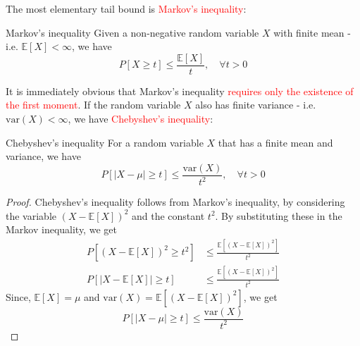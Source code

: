 \documentclass[10pt,handout,english]{beamer}
\newcommand{\E}{\mathbb{E}}
\begin{document}
\begin{frame}[allowframebreaks]
The most elementary tail bound is \textcolor{red}{Markov's inequality}:
\begin{block}{Markov's inequality}
Given a non-negative random variable $X$ with finite mean - i.e. $\E[X]<\infty$, we have
\[
P[X\geq t]\leq\frac{\E[X]}{t},\quad \forall t>0
\]
\end{block}
It is immediately obvious that Markov's inequality \textcolor{red}{requires only the existence of the first moment}. If the random variable $X$ also has finite variance - i.e. $\text{var}(X)<\infty$, we have \textcolor{red}{Chebyshev's inequality}:
\begin{block}{Chebyshev's inequality}
For a random variable $X$ that has a finite mean and variance, we have
\[
P[\lvert X-\mu \rvert\geq t]\leq\frac{\text{var}(X)}{t^2},\quad \forall t>0
\]
\end{block} 
\end{frame}
\begin{frame}
\begin{proof}
Chebyshev's inequality follows from Markov's inequality, by considering the variable $(X-\E[X])^2$ and the constant $t^2$. By substituting these in the Markov inequality, we get
\begin{align}
P[(X-\E[X])^2\geq t^2]&\leq \frac{\E[(X-\E[X])^2]}{t^2}\\
P[\lvert X-\E[X] \rvert\geq t]&\leq\frac{\E[(X-\E[X])^2]}{t^2}
\end{align}
Since, $\E[X]=\mu$ and $\text{var}(X)=\E[(X-\E[X])^2]$, we get
\[
P[\lvert X-\mu \rvert\geq t]\leq\frac{\text{var}(X)}{t^2}
\]
\end{proof}
\end{frame}
\end{document}
